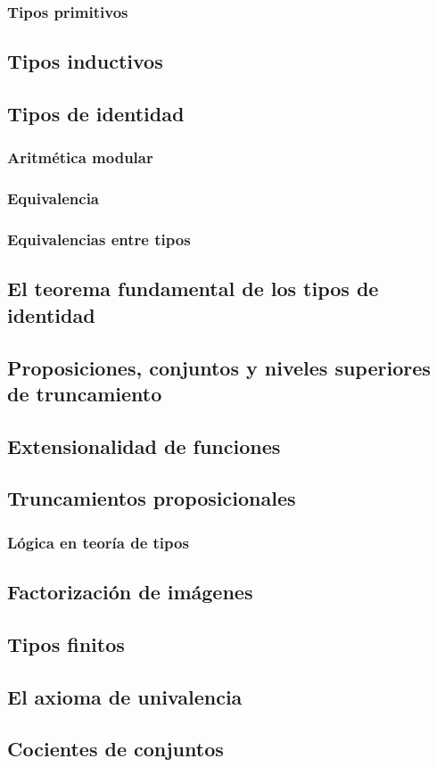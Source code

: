 \documentclass{article}
\begin{document}
        
        
        
    \subsubsection{Tipos primitivos}

\subsection{Tipos inductivos}

\subsection{Tipos de identidad}

\subsubsection{Aritmética modular}

\subsubsection{Equivalencia}
    \subsubsection{Equivalencias entre tipos}
\subsection{El teorema fundamental de los tipos de identidad}
\subsection{Proposiciones, conjuntos y niveles superiores de truncamiento}
\subsection{Extensionalidad de funciones}
\subsection{Truncamientos proposicionales}
\subsubsection{Lógica en teoría de tipos}
\subsection{Factorización de imágenes}
\subsection{Tipos finitos}
\subsection{El axioma de univalencia}
\subsection{Cocientes de conjuntos}



\end{document}

